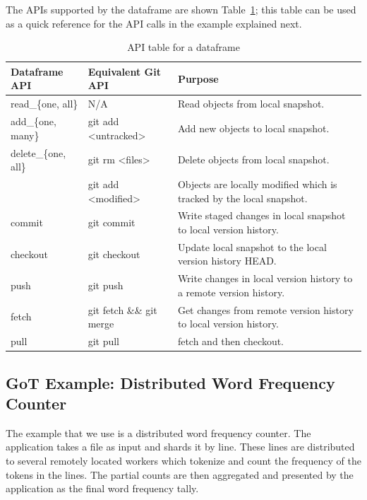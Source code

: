 
The APIs supported by the dataframe are shown Table~\ref{tbl:api}; this table can be used as a quick reference for the API calls in the example explained next.

\begin{table}
  \begin{tabular}{lll}
    \toprule
    Dataframe API & Equivalent Git API & Purpose \\
    \midrule
    read\_\{one, all\} & N/A & Read objects from local snapshot. \\
    add\_\{one, many\} & git add <untracked> & Add new objects to local snapshot. \\
    delete\_\{one, all\} & git rm <files> & Delete objects from local snapshot. \\
    \midrule
     & git add <modified> & Objects are locally modified which is tracked by the local snapshot. \\
    \midrule
    commit & git commit & Write staged changes in local snapshot to local version history. \\
    checkout & git checkout & Update local snapshot to the local version history HEAD. \\
    \midrule
    push & git push & Write changes in local version history to a remote version history. \\
    fetch & git fetch \&\& git merge & Get changes from remote version history to local version history. \\
    pull & git pull & fetch and then checkout. \\
    \bottomrule
  \end{tabular}
  \caption{API table for a dataframe}
  \label{tbl:api}
\end{table}

\subsection{GoT Example: Distributed Word Frequency Counter}
The example that we use is a distributed word frequency counter. The application takes a file as input and shards it by line. These lines are distributed to several remotely located workers which tokenize and count the frequency of the tokens in the lines. The partial counts are then aggregated and presented by the application as the final word frequency tally. 

